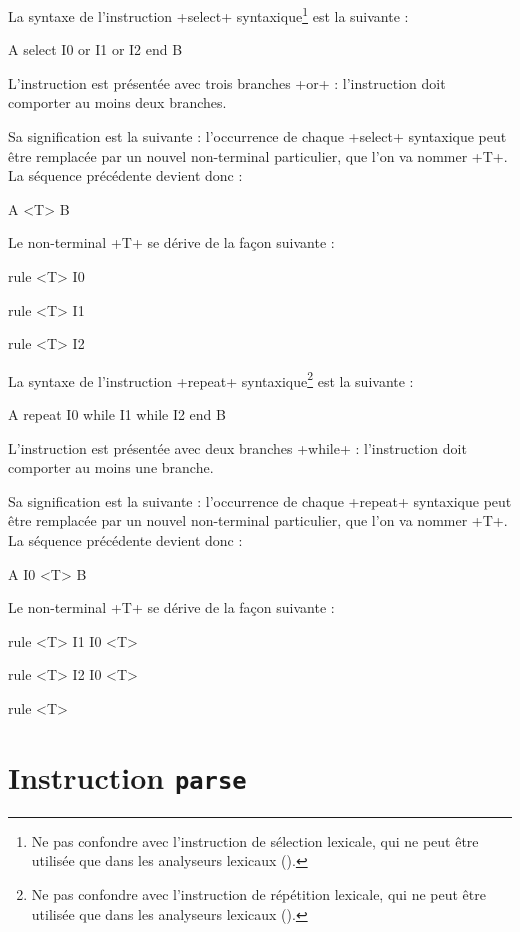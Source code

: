 
La syntaxe de l'instruction \ggst+select+ syntaxique\footnote{Ne pas confondre avec l'instruction de sélection lexicale, qui ne peut être utilisée que dans les analyseurs lexicaux ().} est la suivante :
\begin{galgas3}
A
select
  I0
or
  I1
or
  I2
end
B
\end{galgas3}

L'instruction est présentée avec trois branches \ggst+or+ : l'instruction doit comporter au moins deux branches.

Sa signification est la suivante : l'occurrence de chaque \ggst+select+ syntaxique peut être remplacée par un nouvel non-terminal particulier, que l'on va nommer \ggst+T+. La séquence précédente devient donc :
\begin{galgas3}
A
<T>
B
\end{galgas3}

Le non-terminal \ggst+T+ se dérive de la façon suivante :
\begin{galgas3}
rule <T> { I0 }

rule <T> { I1 }

rule <T> { I2 }
\end{galgas3}








La syntaxe de l'instruction \ggst+repeat+ syntaxique\footnote{Ne pas confondre avec l'instruction de répétition lexicale, qui ne peut être utilisée que dans les analyseurs lexicaux ().} est la suivante :
\begin{galgas3}
A
repeat
  I0
while
  I1
while
  I2
end
B
\end{galgas3}

L'instruction est présentée avec deux branches \ggst+while+ : l'instruction doit comporter au moins une branche.

Sa signification est la suivante : l'occurrence de chaque \ggst+repeat+ syntaxique peut être remplacée par un nouvel non-terminal particulier, que l'on va nommer \ggst+T+. La séquence précédente devient donc :
\begin{galgas3}
A
I0
<T>
B
\end{galgas3}

Le non-terminal \ggst+T+ se dérive de la façon suivante :
\begin{galgas3}
rule <T> { I1 I0 <T> }

rule <T> { I2 I0 <T> }

rule <T> {  }
\end{galgas3}







\section{Instruction \texttt{parse}}











